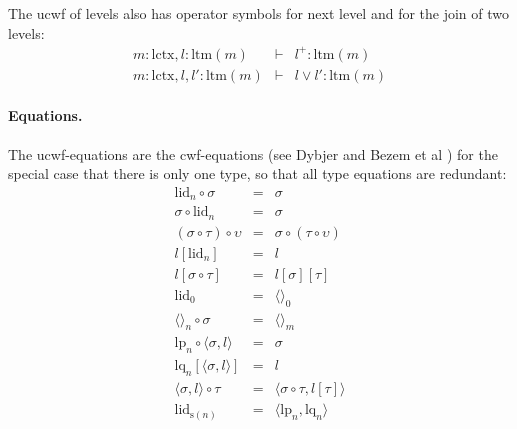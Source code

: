 \documentclass[11pt,a4paper]{article}
\theoremstyle{plain}
\theoremstyle{definition}
\newcommand{\id}{\mathsf{id}}
\def\Hom{\mathrm{hom}}
\def\id{\mathrm{id}}
\def\lctx{\mathrm{lctx}}
\def\ltm{\mathrm{ltm}}
\def\lp{\mathrm{lp}}
\def\lq{\mathrm{lq}}
\def\s{\mathrm{s}}
\def\lid{\mathrm{lid}}
\newcommand{\ctx}{\mathrm{ctx}}
\newcommand{\ty}{\mathrm{ty}}
\newcommand{\tm}{\mathrm{tm}}
\newcommand{\tuple}[1]{\langle #1 \rangle}
\begin{document}
The ucwf of levels also has operator symbols for next level and for the join of two levels:
\begin{eqnarray*}
m : \lctx, l : \ltm(m) &\vdash& l^+ : \ltm(m)\\
m : \lctx, l,l' : \ltm(m) &\vdash& l \vee l' : \ltm(m)
\end{eqnarray*}

\paragraph{Equations.} 
The ucwf-equations are the cwf-equations (see Dybjer \cite{dybjer:torino} and Bezem et al \cite{BezemCDE22})
for the special case that there is only one type, so that all type equations are redundant:
\begin{eqnarray*}
\lid_{n} \circ \sigma &=& \sigma \\
 \sigma \circ \lid_{n} &=& \sigma \\
(\sigma \circ \tau) \circ \upsilon &=& \sigma \circ (\tau \circ \upsilon)\\
l[\lid_{n}] &=& l \\
l[\sigma\circ\tau] &=& l[\sigma][\tau]\\
\lid_{0} &=& \tuple{}_{0}\\
\tuple{}_{n}\circ\sigma &=& \tuple{}_{m}\\
\lp_n \circ \tuple{\sigma,l} &=& \sigma\\
\lq_n [\tuple{\sigma,l}] &=& l\\
\tuple{\sigma,l} \circ \tau &=& \tuple{\sigma \circ \tau,l[\tau]}\\
\lid_{\s(n)} &=& \tuple{\lp_n,\lq_n}\\
\end{eqnarray*}
\end{document}
